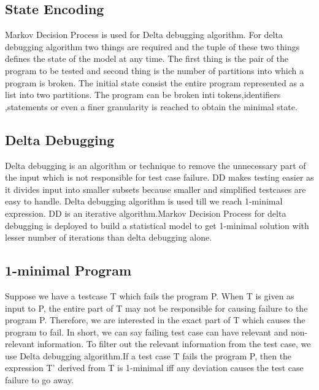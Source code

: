\documentclass{relatorio}
\begin{document}
\subsection{State Encoding}%
\label{Tools}

Markov Decision Process is used for Delta debugging algorithm. For  delta debugging algorithm two things are required and the tuple of these two things defines the state of the model at any time. The first thing is the pair of the program to be tested and second thing is the number of partitions into which a program is broken. The initial state consist the entire program  represented as a list into two partitions. The program can be broken inti tokens,identifiers ,statements or even a finer granularity is reached to obtain the minimal state.

\subsection{Delta Debugging}%
\label{Tools}

Delta debugging is an algorithm or technique to remove the unnecessary part of the input which is not responsible for test case failure. DD makes testing easier as it divides input into smaller subsets because smaller  and simplified testcases are easy to handle. Delta debugging algorithm is used till we reach 1-minimal expression. DD is an iterative algorithm.Markov Decision Process for delta debugging is deployed to build a statistical model to get 1-minimal solution with lesser number of iterations than delta debugging alone.


\subsection{1-minimal Program}%
\label{Tools}

Suppose we have a testcase T which fails the program P. When T is given as input to P, the entire part of T may not be responsible for causing failure to the program P. Therefore, we are interested in the exact part of T which causes the program to fail. In short, we can say failing test case can have relevant and non-relevant information. To filter out the relevant information from the test case, we use Delta debugging algorithm.If a test case T fails the program P, then the expression T’ derived from T is 1-minimal iff any deviation causes the test case failure to go away.
\end{document}
